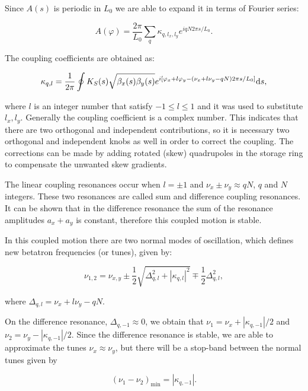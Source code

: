 Since $A(s)$ is periodic in $L_0$ we are able to expand it in terms of Fourier series:

\begin{equation*}
    A(\varphi) = \dfrac{2\pi}{L_0} \sum_{q} \kappa_{q, l_x, l_y}e^{i q N 2 \pi s/L_0}.
\end{equation*}

The coupling coefficients are obtained as:

\begin{equation}
    \kappa_{q, l} = \dfrac{1}{2\pi} \oint K_S(s) \sqrt{\beta_x(s) \beta_y(s)} e^{i\left[\varphi_x + l\varphi_y - \left(\nu_x + l\nu_y - qN\right)2\pi s/L_0\right]}\mathrm{d} s,
\end{equation}

where $l$ is an integer number that satisfy $-1 \leq l \leq 1$ and it was used to substitute $l_x, l_y$. Generally the coupling coefficient is a complex number. This indicates that there are two orthogonal and independent contributions, so it is necessary two orthogonal and independent knobs as well in order to correct the coupling. The corrections can be made by adding rotated (skew) quadrupoles in the storage ring to compensate the unwanted skew gradients.

The linear coupling resonances occur when $l = \pm 1$ and $\nu_x \pm \nu_y \approx qN$, $q$ and $N$ integers. These two resonances are called sum and difference coupling resonances. It can be shown that in the difference resonance the sum of the resonance amplitudes $a_x + a_y$ is constant, therefore this coupled motion is stable.

In this coupled motion there are two normal modes of oscillation, which defines new betatron frequencies (or tunes), given by:

\begin{equation}
    \nu_{1, 2} = \nu_{x, y} \pm \dfrac{1}{2}\sqrt{\Delta_{q, l}^2 + |\kappa_{q, l}|^2} \mp \dfrac{1}{2}\Delta_{q, l}^2,
\end{equation}

where $\Delta_{q, l} = \nu_x + l\nu_y - q N$. 

On the difference resonance, $\Delta_{q, -1} \approx 0$, we obtain that $\nu_1 = \nu_x + |\kappa_{q, -1}|/2$ and $\nu_2 = \nu_y - |\kappa_{q, -1}|/2$. Since the difference resonance is stable, we are able to approximate the tunes $\nu_x \approx \nu_y$, but there will be a stop-band between the normal tunes given by

\begin{equation}
\left(\nu_1 - \nu_2\right)_{\mathrm{min}} = |\kappa_{q, -1}|.
\end{equation}

